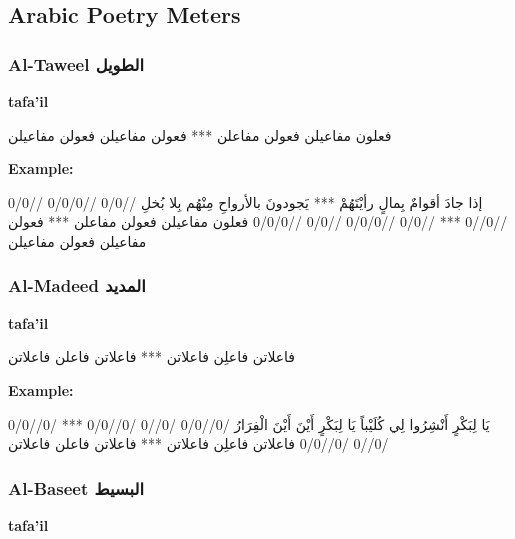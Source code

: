 \subsection{Arabic Poetry Meters}
\subsubsection{Al-Taweel \textarabic{الطويل}}
\textbf{tafa'il}
\begin{Arabic}
	\begin{traditionalpoem*}
          فعلون مفاعيلن فعولن مفاعلن *** فعولن مفاعيلن فعولن مفاعيلن
	\end{traditionalpoem*}
      \end{Arabic}
\textbf{Example:}
\begin{Arabic}
	\begin{traditionalpoem*}
          إذا جادَ أقوامٌ بِمالٍ رأيْتَهُمْ  *** يَجودونَ بالأرواحِ مِنْهُم بِلا بُخلِ
          //0/0 //0/0/0 //0/0 //0//0 *** //0/0 //0/0/0 //0/0 //0/0/0
          فعلون مفاعيلن فعولن مفاعلن *** فعولن مفاعيلن فعولن مفاعيلن
	\end{traditionalpoem*}
      \end{Arabic}


\subsubsection{Al-Madeed \textarabic{المديد}}
\textbf{tafa'il}

\begin{Arabic}
	\begin{traditionalpoem*}
فاعلاتن فاعلِن فاعلاتن *** فاعلاتن فاعلن فاعلاتن
	\end{traditionalpoem*}
      \end{Arabic}
\textbf{Example:}
\begin{Arabic}
	\begin{traditionalpoem*}
    يَا لِبَكْرٍ أَنْشِرُوا لِي كُلَيْباً	يَا لِبَكْرٍ أَيْنَ أَيْنَ الْفِرَارُ
/0//0/0 /0//0 /0//0/0 *** /0//0/0 /0//0 /0//0/0
فاعلاتن فاعلِن فاعلاتن *** فاعلاتن فاعلن فاعلاتن
	\end{traditionalpoem*}
      \end{Arabic}
\subsubsection{Al-Baseet \textarabic{البسيط}}
\textbf{tafa'il}

